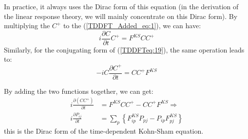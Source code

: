 In practice, it always uses the Dirac form of this equation (in the
derivation of the linear response theory, we will mainly concentrate
on this Dirac form). By multiplying the $C^{+}$ to the
(\ref{TDDFT_Added_eq:1}), we can have:
\begin{equation}\label{}
i\frac{\partial C}{\partial t}C^{+} = F^{KS}CC^{+}
\end{equation}
Similarly, for the conjugating form of (\ref{TDDFTeq:19}), the same
operation leads to:
\begin{equation}\label{}
-iC\frac{\partial C^{+}}{\partial t} = CC^{+}F^{KS}
\end{equation}

By adding the two functions together, we can get:
\begin{align}\label{TDDFTeq:21}
i \frac{\partial \left(CC^{+}\right)}{\partial t} &= F^{KS}CC^{+} - 
CC^{+}F^{KS}
\Rightarrow \nonumber \\
i \frac{\partial P_{ij}}{\partial t} &=
\sum_{p}\left\{F^{KS}_{ip}P_{pj} - P_{ip}F^{KS}_{pj}\right\}
\end{align}
this is the Dirac form of the time-dependent Kohn-Sham equation.

